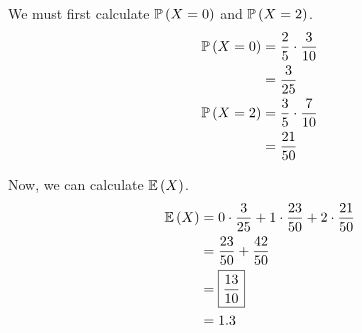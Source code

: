 \documentclass{article}
\begin{document}
\subproblema{}
We must first calculate $\mathbb{P} \left ( X = 0 \right)$ and $\mathbb{P} \left ( X = 2 \right)$.
\begin{align*}
  \mathbb{P} \left ( X = 0 \right) &= \frac{2}{5} \cdot \frac{3}{10} \\
             &= \frac{3}{25} \\
  \mathbb{P} \left ( X = 2 \right) &= \frac{3}{5} \cdot \frac{7}{10} \\
             &= \frac{21}{50} \\
\end{align*}

Now, we can calculate $\mathbb{E} \left ( X \right)$.
\begin{align*}
  \mathbb{E} \left ( X \right) &= 0 \cdot \frac{3}{25} + 1 \cdot \frac{23}{50} + 2 \cdot \frac{21}{50} \\
         &= \frac{23}{50} + \frac{42}{50} \\
         &= \boxed{\frac{13}{10}} \\
         &= 1.3 \\
\end{align*}
\end{document}
